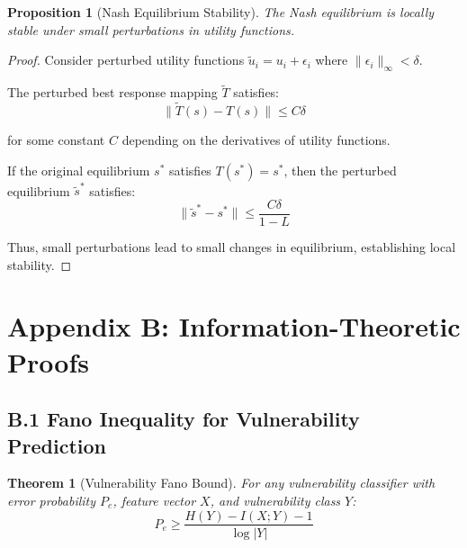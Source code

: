 \documentclass[journal]{IEEEtran}
\newtheorem{theorem}{Theorem}
\newtheorem{proposition}{Proposition}
\begin{document}
\begin{proposition}[Nash Equilibrium Stability]
The Nash equilibrium is locally stable under small perturbations in utility functions.
\end{proposition}

\begin{proof}
Consider perturbed utility functions $\tilde{u}_i = u_i + \epsilon_i$ where $\|\epsilon_i\|_\infty < \delta$.

The perturbed best response mapping $\tilde{T}$ satisfies:
$$\|\tilde{T}(s) - T(s)\| \leq C \delta$$

for some constant $C$ depending on the derivatives of utility functions.

If the original equilibrium $s^*$ satisfies $T(s^*) = s^*$, then the perturbed equilibrium $\tilde{s}^*$ satisfies:
$$\|\tilde{s}^* - s^*\| \leq \frac{C \delta}{1-L}$$

Thus, small perturbations lead to small changes in equilibrium, establishing local stability.
\end{proof}

\section{Appendix B: Information-Theoretic Proofs}

\subsection{B.1 Fano Inequality for Vulnerability Prediction}

\begin{theorem}[Vulnerability Fano Bound]
For any vulnerability classifier with error probability $P_e$, feature vector $X$, and vulnerability class $Y$:
$$P_e \geq \frac{H(Y) - I(X;Y) - 1}{\log |Y|}$$
\end{theorem}
\end{document}
